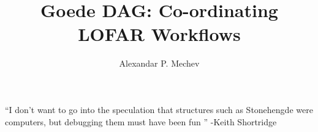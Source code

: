 \documentclass[8pt,a5paper,twoside,openright]{book}
\begin{document}
\title{\LARGE {\bf Goede DAG: Co-ordinating LOFAR Workflows}\\
 \vspace*{6mm}
}

\author{Alexandar P. Mechev}

\normallinespacing
\maketitle
\onehalfspacing

\preface





\body
``I don't want to go into the speculation that structures such as Stonehengde were computers, but debugging them must have been fun '' -Keith Shortridge

%













\stopthumb


{}
%	
\printbibliography
\end{document}
